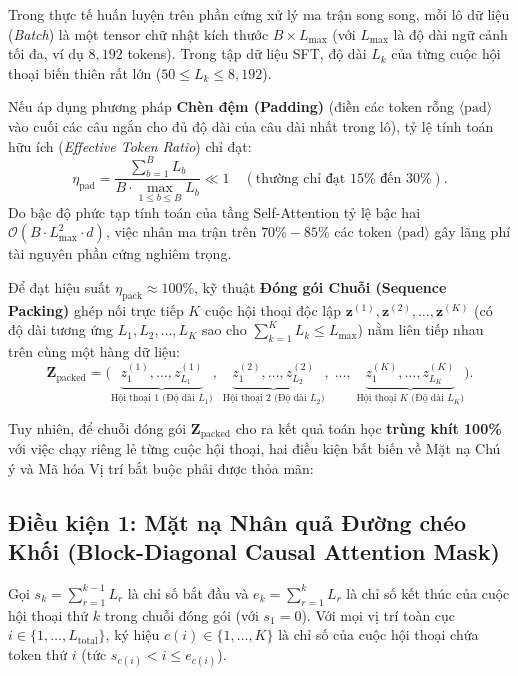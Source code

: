Trong thực tế huấn luyện trên phần cứng xử lý ma trận song song, mỗi lô dữ liệu (\textit{Batch}) là một tensor chữ nhật kích thước $B \times L_{\max}$ (với $L_{\max}$ là độ dài ngữ cảnh tối đa, ví dụ $8,192$ tokens). Trong tập dữ liệu SFT, độ dài $L_k$ của từng cuộc hội thoại biến thiên rất lớn ($50 \le L_k \le 8,192$).

Nếu áp dụng phương pháp \textbf{Chèn đệm (Padding)} (điền các token rỗng $\langle\text{pad}\rangle$ vào cuối các câu ngắn cho đủ độ dài của câu dài nhất trong lô), tỷ lệ tính toán hữu ích (\textit{Effective Token Ratio}) chỉ đạt:
\begin{equation}
    \eta_{\text{pad}} = \frac{\sum_{b=1}^{B} L_b}{B \cdot \max_{1 \le b \le B} L_b} \ll 1 \quad (\text{thường chỉ đạt } 15\% \text{ đến } 30\%).
\end{equation}
Do bậc độ phức tạp tính toán của tầng Self-Attention tỷ lệ bậc hai $\mathcal{O}(B \cdot L_{\max}^2 \cdot d)$, việc nhân ma trận trên $70\% - 85\%$ các token $\langle\text{pad}\rangle$ gây lãng phí tài nguyên phần cứng nghiêm trọng.

Để đạt hiệu suất $\eta_{\text{pack}} \approx 100\%$, kỹ thuật \textbf{Đóng gói Chuỗi (Sequence Packing)} ghép nối trực tiếp $K$ cuộc hội thoại độc lập $\mathbf{z}^{(1)}, \mathbf{z}^{(2)}, \dots, \mathbf{z}^{(K)}$ (có độ dài tương ứng $L_1, L_2, \dots, L_K$ sao cho $\sum_{k=1}^{K} L_k \le L_{\max}$) nằm liên tiếp nhau trên cùng một hàng dữ liệu:
\begin{equation}
    \mathbf{Z}_{\text{packed}} = \big( \underbrace{z^{(1)}_1, \dots, z^{(1)}_{L_1}}_{\text{Hội thoại } 1 \text{ (Độ dài } L_1\text{)}},\; \underbrace{z^{(2)}_1, \dots, z^{(2)}_{L_2}}_{\text{Hội thoại } 2 \text{ (Độ dài } L_2\text{)}},\; \dots,\; \underbrace{z^{(K)}_1, \dots, z^{(K)}_{L_K}}_{\text{Hội thoại } K \text{ (Độ dài } L_K\text{)}} \big).
\end{equation}

Tuy nhiên, để chuỗi đóng gói $\mathbf{Z}_{\text{packed}}$ cho ra kết quả toán học \textbf{trùng khít 100\%} với việc chạy riêng lẻ từng cuộc hội thoại, hai điều kiện bất biến về Mặt nạ Chú ý và Mã hóa Vị trí bắt buộc phải được thỏa mãn:

\subsection{Điều kiện 1: Mặt nạ Nhân quả Đường chéo Khối (Block-Diagonal Causal Attention Mask)}
Gọi $s_k = \sum_{r=1}^{k-1} L_r$ là chỉ số bắt đầu và $e_k = \sum_{r=1}^{k} L_r$ là chỉ số kết thúc của cuộc hội thoại thứ $k$ trong chuỗi đóng gói (với $s_1 = 0$). Với mọi vị trí toàn cục $i \in \{1, \dots, L_{\text{total}}\}$, ký hiệu $c(i) \in \{1, \dots, K\}$ là chỉ số của cuộc hội thoại chứa token thứ $i$ (tức $s_{c(i)} < i \le e_{c(i)}$).

